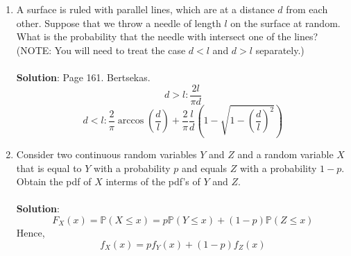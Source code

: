 \documentclass{article}
\newcommand{\Pb}{\mathbb{P}}
\newcommand{\soln}[1]{\\ \textbf{Solution}: #1}
\newcommand{\bkt}[1]{\left(#1\right)}
\begin{document}
\begin{enumerate}
		\soln{
		$z = \dfrac{45-34}5 = 2.2$. $\Phi\bkt{2.2} = 0.9861$. Hence, desired probability is $1-0.9861 = 0.1039$.
		}
		\item
		A surface is ruled with parallel lines, which are at a distance $d$ from each other. Suppose that we throw a needle of length $l$ on the surface at random. What is the probability that the needle with intersect one of the lines? (NOTE: You will need to treat the case $d<l$ and $d>l$ separately.)\\
		\soln{
		Page 161. Bertsekas.
		$$d > l: \dfrac{2l}{\pi d}$$
		$$d < l: \dfrac2{\pi} \arccos\bkt{\dfrac{d}l} + \dfrac2{\pi} \dfrac{l}d \bkt{1-\sqrt{1-\bkt{\dfrac{d}l}^2}}$$
		}
		\item
		Consider two continuous random variables $Y$ and $Z$ and a random variable $X$ that is equal to $Y$ with a probability $p$ and equals $Z$ with a probability $1-p$. Obtain the pdf of $X$ interms of the pdf's of $Y$ and $Z$.\\
		\soln{
		$$F_X(x) = \Pb\bkt{X \leq x} = p \Pb\bkt{Y \leq x} + \bkt{1-p} \Pb\bkt{Z \leq x}$$
		Hence,
		$$f_X(x) = p f_Y(x) + \bkt{1-p} f_Z(x)$$
		}
	\end{enumerate}
\end{document}
